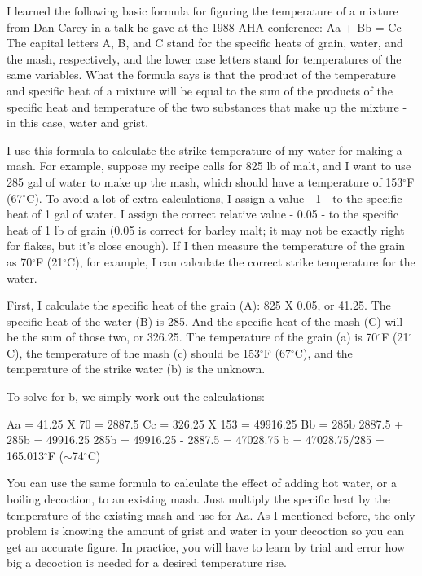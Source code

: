 \documentclass[letterpaper,12pt]{article}
\begin{document}
I learned the following basic formula for figuring the temperature of a mixture from Dan Carey in a talk he gave at the 1988 AHA conference: \newline
Aa + Bb = Cc \newline
The capital letters A, B, and C stand for the specific heats of grain, water, and the mash, respectively, and the lower case letters stand for temperatures of the same variables. What the formula says is that the product of the temperature and specific heat of a mixture will be equal to the sum of the products of the specific heat and temperature of the two substances that make up the mixture - in this case, water and grist.

I use this formula to calculate the strike temperature of my water for making a mash. For example, suppose my recipe calls for 825 lb of malt, and I want to use 285 gal of water to make up the mash, which should have a temperature of 153$^\circ$F (67$^\circ$C). To avoid a lot of extra calculations, I assign a value - 1 - to the specific heat of 1 gal of water. I assign the correct relative value - 0.05 - to the specific heat of 1 lb of grain (0.05 is correct for barley malt; it may not be exactly right for flakes, but it's close enough). If I then measure the temperature of the grain as 70$^\circ$F (21$^\circ$C), for example, I can calculate the correct strike temperature for the water.

First, I calculate the specific heat of the grain (A): 825 X 0.05, or 41.25. The specific heat of the water (B) is 285. And the specific heat of the mash (C) will be the sum of those two, or 326.25. The temperature of the grain (a) is 70$^\circ$F (21$^\circ$C), the temperature of the mash (c) should be 153$^\circ$F (67$^\circ$C), and the temperature of the strike water (b) is the unknown.

To solve for b, we simply work out the calculations:

Aa = 41.25 X 70 = 2887.5
Cc = 326.25 X 153 = 49916.25
Bb = 285b
2887.5 + 285b = 49916.25
285b = 49916.25 - 2887.5 = 47028.75
b = 47028.75/285 = 165.013$^\circ$F ($\sim$74$^\circ$C)

You can use the same formula to calculate the effect of adding hot water, or a boiling decoction, to an existing mash. Just multiply the specific heat by the temperature of the existing mash and use for Aa. As I mentioned before, the only problem is knowing the amount of grist and water in your decoction so you can get an accurate figure. In practice, you will have to learn by trial and error how big a decoction is needed for a desired temperature rise.
\end{document}
